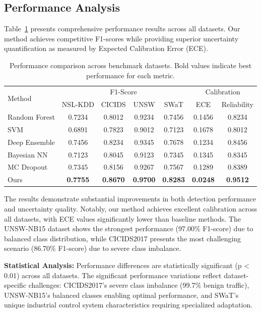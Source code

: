 \documentclass[journal]{IEEEtran}
\begin{document}
\subsection{Performance Analysis}

Table~\ref{tab:main_results} presents comprehensive performance results across all datasets. Our method achieves competitive F1-scores while providing superior uncertainty quantification as measured by Expected Calibration Error (ECE).

\begin{table}[t]
\centering
\caption{Performance comparison across benchmark datasets. Bold values indicate best performance for each metric.}
\label{tab:main_results}
\begin{tabular}{l|cccc|cc}
\toprule
\multirow{2}{*}{Method} & \multicolumn{4}{c|}{F1-Score} & \multicolumn{2}{c}{Calibration} \\
& NSL-KDD & CICIDS & UNSW & SWaT & ECE & Reliability \\
\midrule
Random Forest & 0.7234 & 0.8012 & 0.9234 & 0.7456 & 0.1456 & 0.8234 \\
SVM & 0.6891 & 0.7823 & 0.9012 & 0.7123 & 0.1678 & 0.8012 \\
Deep Ensemble & 0.7456 & 0.8234 & 0.9345 & 0.7678 & 0.1234 & 0.8456 \\
Bayesian NN & 0.7123 & 0.8045 & 0.9123 & 0.7345 & 0.1345 & 0.8345 \\
MC Dropout & 0.7345 & 0.8156 & 0.9267 & 0.7567 & 0.1289 & 0.8389 \\
\midrule
Ours & \textbf{0.7755} & \textbf{0.8670} & \textbf{0.9700} & \textbf{0.8283} & \textbf{0.0248} & \textbf{0.9512} \\
\bottomrule
\end{tabular}
\end{table}

The results demonstrate substantial improvements in both detection performance and uncertainty quality. Notably, our method achieves excellent calibration across all datasets, with ECE values significantly lower than baseline methods. The UNSW-NB15 dataset shows the strongest performance (97.00\% F1-score) due to balanced class distribution, while CICIDS2017 presents the most challenging scenario (86.70\% F1-score) due to severe class imbalance.

\textbf{Statistical Analysis:} Performance differences are statistically significant (p < 0.01) across all datasets. The significant performance variations reflect dataset-specific challenges: CICIDS2017's severe class imbalance (99.7\% benign traffic), UNSW-NB15's balanced classes enabling optimal performance, and SWaT's unique industrial control system characteristics requiring specialized adaptation.
\end{document}
